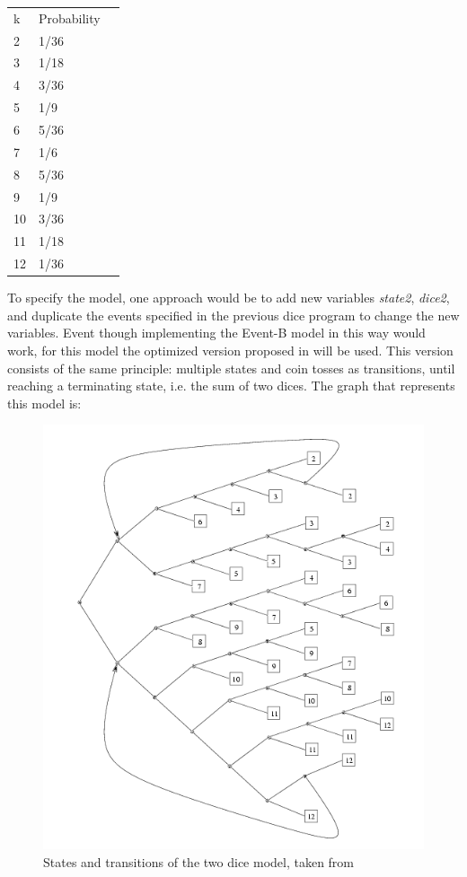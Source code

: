 \begin{table}[H]
\centering
\begin{tabular}{|l|l|l}
\cline{1-2}
k  & Probability &  \\ \cline{1-2}
2  & 1/36        &  \\ \cline{1-2}
3  & 1/18        &  \\ \cline{1-2}
4  & 3/36        &  \\ \cline{1-2}
5  & 1/9         &  \\ \cline{1-2}
6  & 5/36        &  \\ \cline{1-2}
7  & 1/6         &  \\ \cline{1-2}
8  & 5/36        &  \\ \cline{1-2}
9  & 1/9         &  \\ \cline{1-2}
10 & 3/36        &  \\ \cline{1-2}
11 & 1/18        &  \\ \cline{1-2}
12 & 1/36        &  \\ \cline{1-2}
\end{tabular}
\end{table}
To specify the model, one approach would be to add new variables \textit{state2}, \textit{dice2}, and duplicate the events specified in the previous dice program to change the new variables. Event though implementing the Event-B model in this way would work, for this model the optimized version proposed in \cite{knuth} will be used. This version consists of the same principle: multiple states and coin tosses as transitions, until reaching a terminating state, i.e. the sum of two dices. The graph that represents this model is:
\begin{figure}[H]
    \centering
    \includegraphics[scale=0.4]{images/CS3.png}
    \caption{States and transitions of the two dice model, taken from \cite{PRISMDICE}}
    \label{fig:ce3}
\end{figure}
